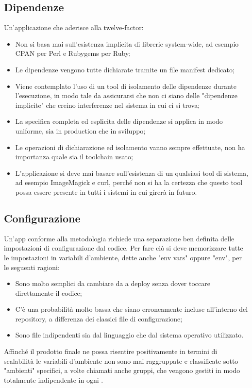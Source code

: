 \documentclass[NormeDiProgetto.tex]{subfiles}
\begin{document}
\subsection{Dipendenze}
Un'applicazione che aderisce alla twelve-factor:
\begin{itemize}
\item Non si basa mai sull'esistenza implicita di librerie system-wide, ad esempio CPAN per Perl e Rubygems per Ruby;
\item Le dipendenze vengono tutte dichiarate tramite un file manifest dedicato;
\item Viene contemplato l'uso di un tool di isolamento delle dipendenze durante l'esecuzione, in modo tale da assicurarsi che non ci siano delle "dipendenze implicite" che creino interferenze nel sistema in cui ci si trova;
\item La specifica completa ed esplicita delle dipendenze si applica in modo uniforme, sia in production che in sviluppo;
\item Le operazioni di dichiarazione ed isolamento vanno sempre effettuate, non ha importanza quale sia il toolchain usato;
\item L'applicazione si deve mai basare sull'esistenza di un qualsiasi tool di sistema, ad esempio ImageMagick e curl, perché non si ha la certezza che questo tool possa essere presente in tutti i sistemi in cui girerà in futuro.
\end{itemize}

\subsection{Configurazione}
Un'app conforme alla metodologia richiede una separazione ben definita delle impostazioni di configurazione dal codice.
Per fare ciò si deve memorizzare tutte le impostazioni in variabili d'ambiente, dette anche "env vars" oppure "env", per le seguenti ragioni:
\begin{itemize}
\item Sono molto semplici da cambiare da  a deploy senza dover toccare direttamente il codice;
\item C'è una probabilità molto bassa che siano erroneamente incluse all'interno del repository, a differenza dei classici file di configurazione;
\item Sono file indipendenti sia dal linguaggio che dal sistema operativo utilizzato.
\end{itemize}
Affinché il prodotto finale ne possa risentire positivamente in termini di scalabilità le variabili d'ambiente non sono mai raggruppate e classificate sotto "ambienti" specifici, a volte chiamati anche gruppi, che vengono gestiti in modo totalmente indipendente in ogni .
\end{document}
